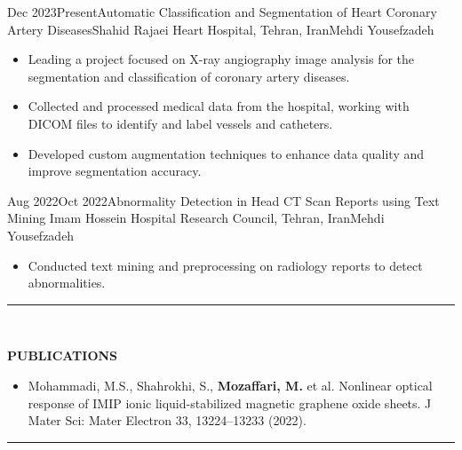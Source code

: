 \documentclass[11pt, b4paper]{cv}
\begin{document}
\begin{research_exp}{Dec 2023}{Present}{Automatic Classification and Segmentation of Heart Coronary Artery Diseases}{Shahid Rajaei Heart Hospital, Tehran, Iran}{Mehdi Yousefzadeh}
	\begin{itemize}
        \item Leading a project focused on X-ray angiography image analysis for the segmentation and classification of coronary artery diseases.
        \item Collected and processed medical data from the hospital, working with DICOM files to identify and label vessels and catheters.
        \item Developed custom augmentation techniques to enhance data quality and improve segmentation accuracy.	\end{itemize}
	
\end{research_exp}
\vspace{-0.1in}

\begin{research_exp}{Aug 2022}{Oct 2022}{Abnormality Detection in Head CT Scan Reports using Text Mining
	}{Imam Hossein Hospital Research Council, Tehran, Iran}{Mehdi Yousefzadeh}
	
	\begin{itemize}
		\item Conducted text mining and preprocessing on radiology reports to detect abnormalities.
	\end{itemize}
\end{research_exp}
    

\vspace{-0.15in}
\rule{\textwidth}{1pt}\\
\vspace{-0.15in}

\textbf{PUBLICATIONS}
\vspace{-0.10in}

\begin{itemize}
	\item 	Mohammadi, M.S., Shahrokhi, S., \textbf{Mozaffari, M.} et al. Nonlinear optical response of IMIP ionic
	liquid-stabilized magnetic graphene oxide sheets. J Mater Sci: Mater Electron 33, 13224–13233
	(2022).
\end{itemize}


\vspace{-0.15in}
\rule{\textwidth}{1pt}\\
\vspace{-0.15in}
\end{document}

